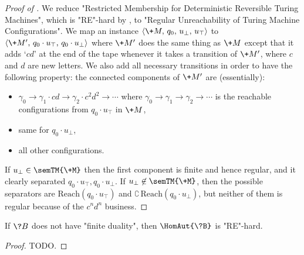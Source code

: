 \begin{proof}[Proof of ]
	We reduce "Restricted Membership for Deterministic Reversible Turing Machines",
	which is "RE"-hard by ,
	to "Regular Unreachability of Turing Machine Configurations".
	We map an instance
	$\langle \+M,\, q_0,\, u_\bot,\, u_\top \rangle$ to $\langle \+M',\, q_0\cdot u_\top,\, q_0\cdot u_\bot \rangle$ where $\+M'$ does the same thing as $\+M$ except that it adds `$cd$' at the end of the tape
	whenever it takes a transition of $\+M'$, where $c$ and $d$ are new letters.
	We also add all necessary transitions in order to have the following property:
	the connected components of $\+M'$ are (essentially):
	\begin{itemize}
		\item $\gamma_0 \to \gamma_1\cdot cd \to \gamma_2\cdot c^2d^2 \to \cdots$
		where $\gamma_0 \to \gamma_1 \to \gamma_2 \to \cdots$ is the reachable configurations from $q_0\cdot u_\top$ in $\+M$,
		\item same for $q_0\cdot u_\bot$,
		\item all other configurations.
	\end{itemize}
	If $u_\bot \in \semTM{\+M}$ then the first component is finite and hence regular, and it clearly separated $q_0\cdot u_\top, q_0\cdot u_\bot$.
	If $u_\bot \not\in \semTM{\+M}$, then the possible separators are $\textrm{Reach}(q_0\cdot u_\top)$
	and $\complement\,\textrm{Reach}(q_0\cdot u_\bot)$, but neither of them is regular because of the
	$c^nd^n$ business. 
\end{proof}

\begin{corollary}
	\AP\label{coro:lowerbound-homreg}
	If $\?B$ does not have "finite duality", then $\HomAut{\?B}$
	is "RE"-hard.
\end{corollary}

\begin{proof}
	TODO.
\end{proof}
